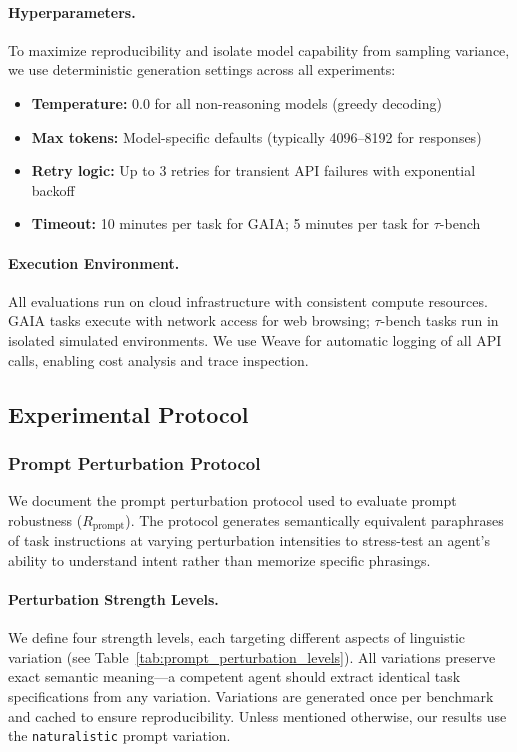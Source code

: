 \documentclass[11pt]{article}
\begin{document}
\paragraph{Hyperparameters.} To maximize reproducibility and isolate model capability from sampling variance, we use deterministic generation settings across all experiments:
\begin{itemize}[leftmargin=*,itemsep=2pt]
    \item \textbf{Temperature:} 0.0 for all non-reasoning models (greedy decoding)
    \item \textbf{Max tokens:} Model-specific defaults (typically 4096--8192 for responses)
    \item \textbf{Retry logic:} Up to 3 retries for transient API failures with exponential backoff
    \item \textbf{Timeout:} 10 minutes per task for GAIA; 5 minutes per task for $\tau$-bench
\end{itemize}

\paragraph{Execution Environment.} All evaluations run on cloud infrastructure with consistent compute resources. GAIA tasks execute with network access for web browsing; $\tau$-bench tasks run in isolated simulated environments. We use Weave for automatic logging of all API calls, enabling cost analysis and trace inspection.


\subsection{Experimental Protocol}
\label{appendix:protocol}

\subsubsection{Prompt Perturbation Protocol}
\label{appendix:prompt_perturbation}

We document the prompt perturbation protocol used to evaluate prompt robustness ($R_{\text{prompt}}$). The protocol generates semantically equivalent paraphrases of task instructions at varying perturbation intensities to stress-test an agent's ability to understand intent rather than memorize specific phrasings.

\paragraph{Perturbation Strength Levels.} We define four strength levels, each targeting different aspects of linguistic variation (see Table~\ref{tab:prompt_perturbation_levels}). All variations preserve exact semantic meaning---a competent agent should extract identical task specifications from any variation. Variations are generated once per benchmark and cached to ensure reproducibility. Unless mentioned otherwise, our results use the \texttt{naturalistic} prompt variation. 
\end{document}
